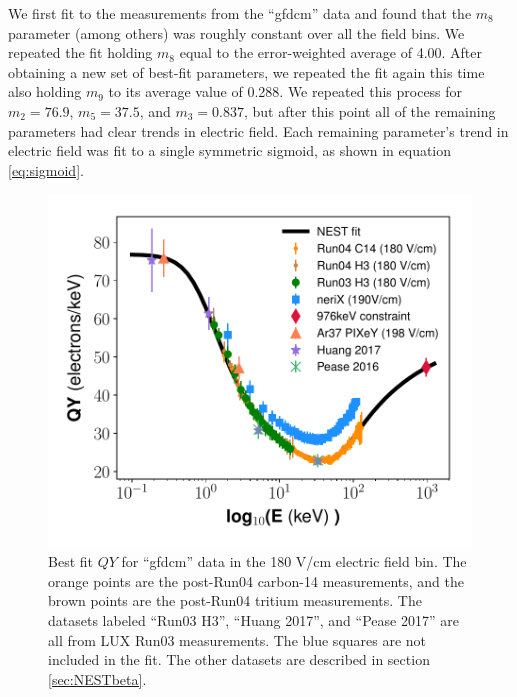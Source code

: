 We first fit to the measurements from the ``gfdcm'' data and found that the $m_8$ parameter (among others) was roughly constant over all the field bins. We repeated the fit holding $m_8$ equal to the error-weighted average of 4.00. After obtaining a new set of best-fit parameters, we repeated the fit again this time also holding $m_9$ to its average value of 0.288. We repeated this process for $m_2=76.9$, $m_5=37.5$, and $m_3=0.837$, but after this point all of the remaining parameters had clear trends in electric field. Each remaining parameter's trend in electric field was fit to a single symmetric sigmoid, as shown in equation \ref{eq:sigmoid}.
\begin{figure}[h!]
  \centering
  \includegraphics[width=\textwidth]{Figures/Yields_fit_old/NEST_fit_180Vcm_old.pdf}
  \caption{Best fit $QY$ for ``gfdcm'' data in the 180 V/cm electric field bin. The orange points are the post-Run04 carbon-14 measurements, and the brown points are the post-Run04 tritium measurements. The datasets labeled ``Run03 H3'', ``Huang 2017'', and ``Pease 2017'' are all from LUX Run03 measurements. The blue squares are not included in the fit. The other datasets are described in section \ref{sec:NESTbeta}.}
  \label{fig:gfdcm_prelim_QY180}
\end{figure}


